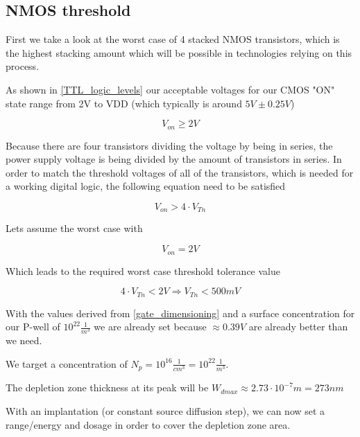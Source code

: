 \subsection{NMOS threshold}\label{nmos_dimensioning}
First we take a look at the worst case of 4 stacked NMOS transistors, which is the highest stacking amount which will be possible in technologies relying on this process.


As shown in  \autoref{TTL_logic_levels} our acceptable voltages for our CMOS "ON" state range from 2V to VDD (which typically is around $5V\pm0.25V$)

\begin{equation}
V_{on} \geq 2V
\end{equation}

Because there are four transistors dividing the voltage by being in series, the power supply voltage is being divided by the amount of transistors in series.
In order to match the threshold voltages of all of the transistors, which is needed for a working digital logic, the following equation need to be satisfied

\begin{equation}
V_{on} > 4 \cdot V_{Tn}
\end{equation}

Lets assume the worst case with

\begin{equation}
V_{on} = 2V
\end{equation}

Which leads to the required worst case threshold tolerance value

\begin{equation}
4 \cdot V_{Tn} < 2V
\Rightarrow
V_{Tn} < 500mV
\end{equation}
 
With the values derived from \autoref{gate_dimensioning} and a surface concentration for our P-well of $10^{22}\frac{1}{m^3}$ we are already set because $\approx 0.39V$ are already better than we need.

We target a concentration of $N_p = 10^{16}\frac{1}{cm^3}=10^{22}\frac{1}{m^3}$.

The depletion zone thickness at its peak will be $W_{dmax} \approx 2.73 \cdot 10^{-7} m = 273 nm$

With an implantation (or constant source diffusion step), we can now set a range/energy and dosage in order to cover the depletion zone area.

